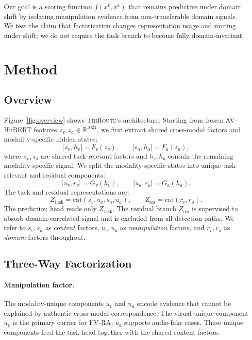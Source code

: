\documentclass{article}
\newcommand{\method}{\textsc{TriRoute}}
\newcommand{\R}{\mathbb{R}}
\begin{document}
Our goal is a scoring function $f(x^v, x^a)$ that remains predictive under domain shift by isolating manipulation evidence from non-transferable domain signals. We test the claim that factorization changes representation usage and routing under shift; we do not require the task branch to become fully domain-invariant.

\section{Method}

\subsection{Overview}

Figure~\ref{fig:overview} shows \method's architecture. Starting from frozen AV-HuBERT features $z_v, z_a \in \R^{1024}$, we first extract shared cross-modal factors and modality-specific hidden states:
\begin{equation}
\big[s_v, h_v\big] = F_v(z_v), \qquad \big[s_a, h_a\big] = F_a(z_a),
\end{equation}
where $s_v, s_a$ are shared task-relevant factors and $h_v, h_a$ contain the remaining modality-specific signal. We split the modality-specific states into unique task-relevant and residual components:
\begin{equation}
\big[u_v, r_v\big] = G_v(h_v), \qquad \big[u_a, r_a\big] = G_a(h_a).
\end{equation}
The task and residual representations are:
\begin{equation}
Z_{\mathrm{task}} = \mathrm{cat}(s_v, u_v, s_a, u_a), \qquad
Z_{\mathrm{res}} = \mathrm{cat}(r_v, r_a).
\end{equation}
The prediction head reads only $Z_{\mathrm{task}}$. The residual branch $Z_{\mathrm{res}}$ is supervised to absorb domain-correlated signal and is excluded from all detection paths. We refer to $s_v, s_a$ as \emph{content} factors, $u_v, u_a$ as \emph{manipulation} factors, and $r_v, r_a$ as \emph{domain} factors throughout.

\subsection{Three-Way Factorization}

\paragraph{Manipulation factor.}
The modality-unique components $u_v$ and $u_a$ encode evidence that cannot be explained by authentic cross-modal correspondence. The visual-unique component $u_v$ is the primary carrier for FV-RA; $u_a$ supports audio-fake cases. These unique components feed the task head together with the shared content factors.
\end{document}
